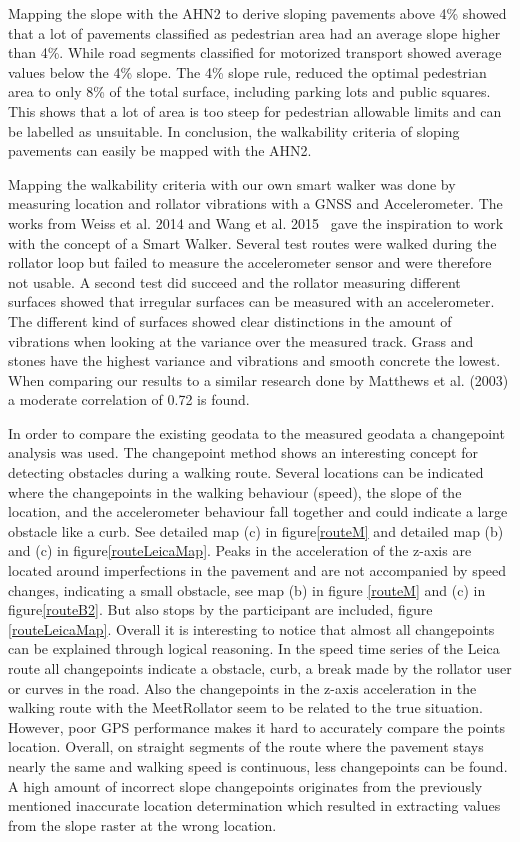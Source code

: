 Mapping the slope with the AHN2 to derive sloping pavements above 4\% showed that a lot of pavements classified as pedestrian area had an average slope higher than 4\%. While road segments classified for motorized transport showed average values below the 4\% slope. The 4\% slope rule, reduced the optimal pedestrian area to only 8\% of the total surface, including parking lots and public squares. This shows that a lot of area is too steep for pedestrian allowable limits and can be labelled as unsuitable. In conclusion, the walkability criteria of sloping pavements can easily be mapped with the AHN2.

Mapping the walkability criteria with our own smart walker was done by measuring location and rollator vibrations with a GNSS and Accelerometer. The works from Weiss et al. 2014 and Wang et al. 2015~\cite{Weiss2014, Wang2015} gave the inspiration to work with the concept of a Smart Walker. Several test routes were walked during the rollator loop but failed to measure the accelerometer sensor and were therefore not usable. A second test did succeed and the rollator measuring different surfaces showed that irregular surfaces can be measured with an accelerometer. The different kind of surfaces showed clear distinctions in the amount of vibrations when looking at the variance over the measured track. Grass and stones have the highest variance and vibrations and smooth concrete the lowest. When comparing our results to a similar research done by Matthews et al. (2003) a moderate correlation of 0.72 is found.

In order to compare the existing geodata to the measured geodata a changepoint analysis was used. The changepoint method shows an interesting concept for detecting obstacles during a walking route. Several locations can be indicated where the changepoints in the walking behaviour (speed), the slope of the location, and the accelerometer behaviour fall together and could indicate a large obstacle like a curb. See detailed map (c) in figure\ref{routeM} and detailed map (b) and (c) in figure\ref{routeLeicaMap}. Peaks in the acceleration of the z-axis are located around imperfections in the pavement and are not accompanied by speed changes, indicating a small obstacle, see map (b) in figure \ref{routeM} and (c) in figure\ref{routeB2}. But also stops by the participant are included, figure \ref{routeLeicaMap}. Overall it is interesting to notice that almost all changepoints can be explained through logical reasoning. In the speed time series of the Leica route all changepoints indicate a obstacle, curb, a break made by the rollator user or curves in the road. Also the changepoints in the z-axis acceleration in the walking route with the MeetRollator seem to be related to the true situation. However, poor GPS performance makes it hard to accurately compare the points location. Overall, on straight segments of the route where the pavement stays nearly the same and walking speed is continuous, less changepoints can be found. A high amount of incorrect slope changepoints originates from the previously mentioned inaccurate location determination which resulted in extracting values from the slope raster at the wrong location. 

